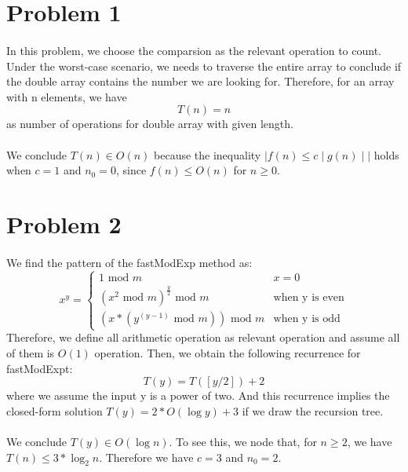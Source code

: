 \documentclass{article}
\author{Zixuan Guo}
\begin{document}
\section{Problem 1}

\paragraph{}
In this problem, we choose the comparsion as the relevant operation to count. Under the worst-case scenario, we needs to traverse
the entire array to conclude if the double array contains the number we are looking for. 
Therefore, for an array with n elements, we have
\[T(n) = n\]
as number of operations for double array with given length.

\paragraph{}
We conclude $ T(n) \in O(n) $ because the inequality $ \mid f(n) \leq c\mid g(n) \mid\mid $ holds when $ c = 1 $ and $ n_0 = 0 $,
since $ f(n) \leq O(n) $ for $ n \geq 0 $.


\section{Problem 2}

\paragraph{}
We find the pattern of the fastModExp method as:
\[ x^y = \begin{cases} 
    1 \text{ mod } m &x = 0 \\
    (x^2 \text{ mod } m)^\frac{y}{2} \text{ mod } m &\text{when y is even} \\
    (x * (y^{(y-1)} \text{ mod } m)) \text{ mod } m &\text{when y is odd}
\end{cases} \]
Therefore, we define all arithmetic operation as relevant operation and assume all of them is $ O(1) $ operation.
Then, we obtain the following recurrence for fastModExpt:
\[ T(y) = T([y/2]) + 2\]
where we assume the input y is a power of two. 
And this recurrence implies the closed-form solution $ T(y)=2*O(\log y) + 3$ if we draw the recursion tree.

\paragraph{}
We conclude $ T(y) \in O(\log n) $. To see this, we node that, for $ n \geq 2 $, we have $ T(n) \leq 3*\log_2 n $.
Therefore we have $ c = 3 $ and $ n_0 = 2 $.
\end{document}

